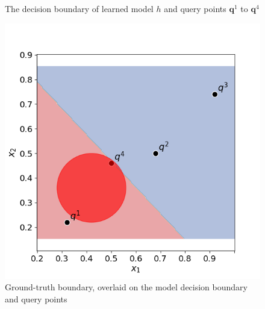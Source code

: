 \documentclass[11pt]{article}
\newcommand{\qu}{\mathbf{q}}
\begin{document}
\begin{figure}[!b]
\begin{minipage}[t]{0.32\linewidth}
        	\vspace{-9mm}\caption{\small The decision boundary of learned model $h$ and query points $\qu^1$ to $\qu^4$}
            \label{fig:ex1:2}
    \end{minipage}
    \hfill
    \begin{minipage}[t]{0.32\linewidth}
        	\centering
        	\includegraphics[width =\textwidth]{submissions/submission1/shahbazi/example_3.png}
        	\vspace{-9mm}\caption{\small Ground-truth boundary, overlaid on the model decision boundary and query points}
            \label{fig:ex1:3}
    \end{minipage}
    \vspace{-5mm}
\end{figure} 
\end{document}
